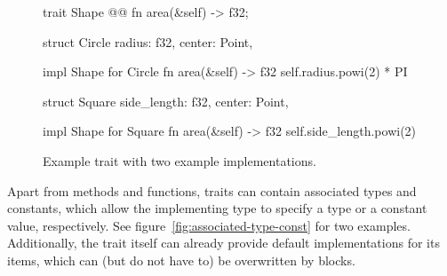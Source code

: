 \begin{figure}[t]
  \centering
  \begin{minipage}{.65\textwidth}
    \begin{rustcode}
    trait Shape {@@
        fn area(&self) -> f32;
    }
    \end{rustcode}
    \end{minipage}

    \vspace{3mm}

    \begin{minipage}[t]{.49\textwidth}
    \begin{rustcode}
    struct Circle {
        radius: f32,
        center: Point,
    }

    impl Shape for Circle {
        fn area(&self) -> f32 {
            self.radius.powi(2) * PI
        }
    }
    \end{rustcode}
  \end{minipage}
  \begin{minipage}[t]{.49\textwidth}
    \begin{rustcode}
    struct Square {
        side_length: f32,
        center: Point,
    }

    impl Shape for Square {
        fn area(&self) -> f32 {
            self.side_length.powi(2)
        }
    }
    \end{rustcode}
  \end{minipage}
  \caption{Example trait with two example implementations.}
  \label{fig:shapes}
\end{figure}

Apart from methods and functions, traits can contain associated types and constants, which allow the implementing type to specify a type or a constant value, respectively.
See figure~\ref{fig:associated-type-const} for two examples.
Additionally, the trait itself can already provide default implementations for its items, which can (but do not have to) be overwritten by  blocks.



